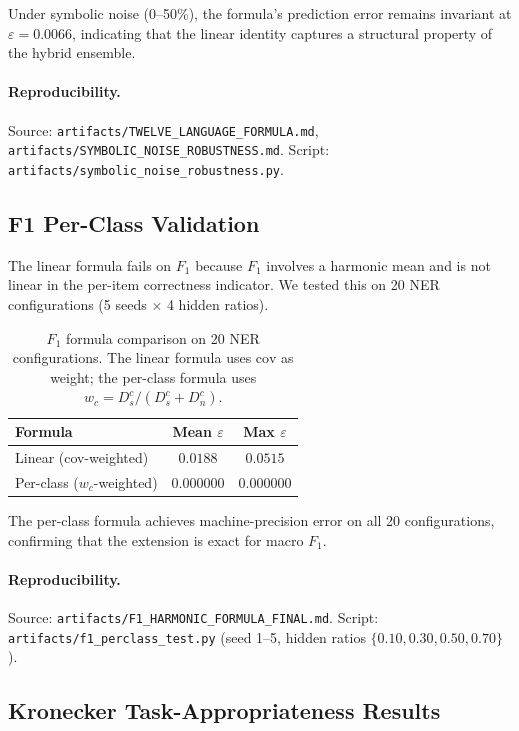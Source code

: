 \documentclass[11pt,a4paper]{article}
\begin{document}
Under symbolic noise (0--50\%), the formula's prediction error remains
invariant at $\varepsilon = 0.0066$, indicating that the linear identity
captures a structural property of the hybrid ensemble.

\paragraph{Reproducibility.}
Source: \texttt{artifacts/TWELVE\_LANGUAGE\_FORMULA.md},
\texttt{artifacts/SYMBOLIC\_NOISE\_ROBUSTNESS.md}.
Script: \texttt{artifacts/symbolic\_noise\_robustness.py}.


\subsection{F1 Per-Class Validation}
\label{sec:exp-f1}

The linear formula fails on $F_1$ because $F_1$ involves a harmonic mean
and is not linear in the per-item correctness indicator. We tested this
on 20 NER configurations (5 seeds $\times$ 4 hidden ratios).

\begin{table}[h]
\centering
\caption{$F_1$ formula comparison on 20 NER configurations. The linear
formula uses $\text{cov}$ as weight; the per-class formula uses
$w_c = D_s^c / (D_s^c + D_n^c)$.}
\label{tab:f1}
\small
\begin{tabular}{lcc}
\toprule
Formula & Mean $\varepsilon$ & Max $\varepsilon$ \\
\midrule
Linear (cov-weighted)     & $0.0188$ & $0.0515$ \\
Per-class ($w_c$-weighted) & $0.000000$ & $0.000000$ \\
\bottomrule
\end{tabular}
\end{table}

The per-class formula achieves machine-precision error on all 20
configurations, confirming that the extension is exact for macro $F_1$.

\paragraph{Reproducibility.}
Source: \texttt{artifacts/F1\_HARMONIC\_FORMULA\_FINAL.md}.
Script: \texttt{artifacts/f1\_perclass\_test.py} (seed 1--5, hidden ratios
$\{0.10, 0.30, 0.50, 0.70\}$).


\subsection{Kronecker Task-Appropriateness Results}
\label{sec:exp-kronecker}
\end{document}
